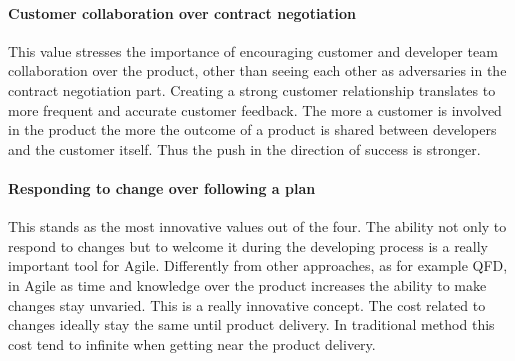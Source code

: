 \documentclass[../main.tex]{subfiles}
\begin{document}
\paragraph{Customer collaboration over contract negotiation}
This value stresses the importance of encouraging customer and developer team collaboration over the product, other than seeing each other as adversaries in the contract negotiation part.
Creating a strong customer relationship translates to more frequent and accurate customer feedback. The more a customer is involved in the product the more the outcome of a product is shared between developers and the customer itself. Thus the push in the direction of success is stronger.  
\paragraph{Responding to change over following a plan}
This stands as the most innovative values out of the four. The ability not only to respond to changes but to welcome it during the developing process is a really important tool for Agile. Differently from other approaches, as for example QFD, in Agile as time and knowledge over the product increases the ability to make changes stay unvaried. This is a really innovative concept. The cost related to changes ideally stay the same until product delivery. In traditional method this cost tend to infinite when getting near the product delivery.

\end{document}
